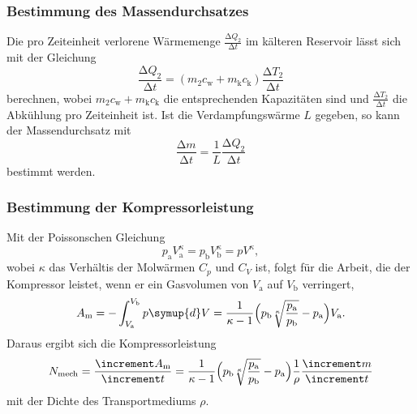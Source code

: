 \subsubsection{Bestimmung des Massendurchsatzes}

Die pro Zeiteinheit verlorene Wärmemenge $\frac{\increment Q_2}{\increment t}$ im
kälteren Reservoir lässt sich mit der Gleichung
\begin{equation}
  \frac{\increment Q_2}{\increment t} = (m_2 c_\text{w} + m_\text{k}c_\text{k})
  \frac{\increment T_2}{\increment t}
  \label{eqn:waerme2}
\end{equation}
berechnen, wobei $m_2 c_\text{w} + m_\text{k}c_\text{k}$ die entsprechenden
Kapazitäten sind und $\frac{\increment T_2}{\increment t}$ die Abkühlung pro Zeiteinheit
ist.
Ist die Verdampfungswärme $L$ gegeben, so kann der Massendurchsatz mit
\begin{equation}
  \frac{\increment m}{\increment t} = \frac{1}{L}\frac{\increment Q_2}{\increment t}
  \label{eqn:massendurch}
\end{equation}
bestimmt werden.

\subsubsection{Bestimmung der Kompressorleistung}

Mit der Poissonschen Gleichung
\begin{equation}
  p_\text{a}V_\text{a}^\kappa = p_\text{b}V_\text{b}^\kappa = pV^\kappa,
  \label{eqn:Poisson}
\end{equation}
wobei $\kappa$ das Verhältis der Molwärmen $C_p$ und $C_V$ ist,
folgt für die Arbeit, die der Kompressor leistet, wenn er ein Gasvolumen von
$V_\text{a}$ auf $V_\text{b}$ verringert,
\begin{equation}
  A_\text{m} = - \int_{V_\text{a}}^{V_\text{b}} p \symup{d}V =
  \frac{1}{\kappa - 1} \Bigl(p_\text{b} \sqrt[\kappa]{\frac{p_\text{a}}
  {p_\text{b}}} - p_\text{a} \Bigr) V_\text{a}.
\end{equation}
Daraus ergibt sich die Kompressorleistung
\begin{equation}
  N_\text{mech} = \frac{\increment A_\text{m}}{\increment t} =
  \frac{1}{\kappa - 1} \Bigl(p_\text{b} \sqrt[\kappa]{\frac{p_\text{a}}
  {p_\text{b}}} - p_\text{a} \Bigr) \frac{1}{\rho} \frac{\increment m}
  {\increment t}
  \label{eqn:mechaleist}
\end{equation}
mit der Dichte des Transportmediums $\rho$.
